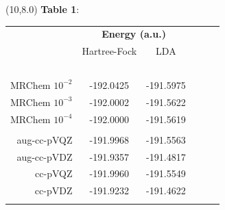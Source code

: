 \documentclass[a0,draft,portrait]{a0poster}
\begin{document}
\begin{textblock}{7}(10,8.0)
\footnotesize
\textbf{Table 1}:
\begin{table}
    \normalsize
    \centering
    \begin{tabular}{|r|cc|cc|}
\hline                   &\multicolumn{2}{c|}{\textbf{Energy (a.u.)}}&   &               \\
                         &Hartree-Fock   &LDA            &               &               \\
\hline  \hspace{55mm}\   &\hspace{62mm}\ &\hspace{62mm}\ &\hspace{62mm}\ &\hspace{62mm}\ \\
	MRChem $10^{-2}$ & -192.0425     & -191.5975     &               &               \\
	MRChem $10^{-3}$ & -192.0002     & -191.5622     &               &               \\
	MRChem $10^{-4}$ & -192.0000     & -191.5619     &               &               \\
	                 &               &               &               &               \\
        aug-cc-pVQZ      & -191.9968     & -191.5563     &               &               \\
	aug-cc-pVDZ      & -191.9357     & -191.4817     &               &               \\
	    cc-pVQZ      & -191.9960     & -191.5549     &               &               \\
	    cc-pVDZ      & -191.9232     & -191.4622     &               &               \\
	                 &               &               &               &               \\
\hline
	\end{tabular}
    \end{table}
\end{textblock}
\end{document}
